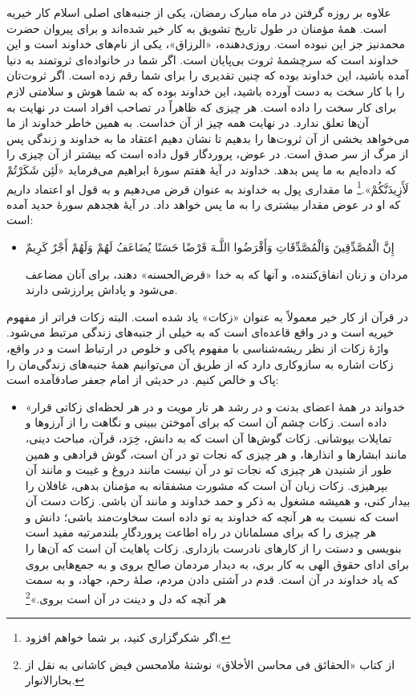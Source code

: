 علاوه بر روزه گرفتن در ماه مبارک رمضان، یکی از جنبه‌های اصلی اسلام کار خیریه است. همهٔ‌ مؤمنان در طول تاریخ تشویق به کار خیر شده‌اند و برای پیروان حضرت محمد{}نیز جز این نبوده است. روزی‌دهنده، «الرزاق»، یکی از نام‌های خداوند است و  این خداوند است که سرچشمهٔ ثروت بی‌پایان است. اگر شما در خانواده‌ای ثروتمند به دنیا آمده باشید، این خداوند بوده که چنین تقدیری را برای شما رقم زده است. اگر ثروت‌تان را با کار سخت به دست آورده باشید، این خداوند بوده که به شما هوش و سلامتی لازم برای کار سخت را داده است. هر چیزی که ظاهراً در تصاحب افراد است در نهایت به آن‌ها تعلق ندارد. در نهایت همه چیز از آن خداست. به همین خاطر خداوند از ما می‌خواهد  بخشی از آن ثروت‌ها را بدهیم تا نشان دهیم اعتقاد ما به خداوند و زندگی پس از مرگ از سر صدق است. در عوض، پروردگار قول داده است که بیشتر از آن چیزی را که داده‌ایم به ما پس بدهد. خداوند در آیهٔ هفتم سورهٔ ابراهیم می‌فرماید {«لَئِن شَكَرْتُمْ لَأَزِيدَنَّكُمْ».}\footnote{اگر شکرگزاری کنید، بر شما خواهم افزود.} ما مقداری پول به خداوند به عنوان قرض  می‌دهیم و به قول او اعتماد داریم که او در عوض مقدار بیشتری را به ما پس خواهد داد. در آیهٔ هجدهم سورهٔ حدید آمده است:

\begin{itemize}
	\item[]
	{
		إِنَّ الْمُصَّدِّقِينَ وَالْمُصَّدِّقَاتِ وَأَقْرَضُوا اللَّـهَ قَرْضًا حَسَنًا يُضَاعَفُ لَهُمْ وَلَهُمْ أَجْرٌ كَرِيمٌ}
	
	{
		مردان و زنان انفاق‌کننده، و آنها که به خدا «قرض‌الحسنه» دهند، برای آنان مضاعف می‌شود و پاداش پرارزشی دارند.}
\end{itemize}

در قرآن از کار خیر معمولاً به عنوان «زکات» یاد شده است. البته زکات فراتر از مفهوم خیریه است و در واقع قاعده‌ای است که به خیلی از جنبه‌های زندگی مرتبط می‌شود. واژهٔ زکات از نظر ریشه‌شناسی با مفهوم پاکی و خلوص در ارتباط است و در واقع، زکات اشاره به سازوکاری دارد که از طریق آن می‌توانیم همهٔ‌ جنبه‌های زندگی‌مان را پاک و خالص کنیم.  در حدیثی از امام جعفر صادق{}آمده است:

\begin{itemize}
	\item[]
	
	{
		«خدواند در همهٔ اعضای بدنت و در رشد هر تار مویت و در هر لحظه‌ای زکاتی قرار داده است. زکات چشم آن است که برای آموختن ببینی و نگاهت را از آرزوها و تمایلات بپوشانی. زکات گوش‌ها آن است که به دانش، خِرَد، قرآن، مباحث دینی، مانند ابشارها و انذارها، و هر چیزی که نجات تو در آن است، گوش فرادهی و همین طور از شنیدن هر چیزی که نجات تو در آن نیست مانند دروغ و غیبت و مانند آن بپرهیزی. زکات زبان آن است که مشورت مشفقانه به مؤمنان بدهی، غافلان را بیدار کنی، و همیشه مشغول به ذکر و حمد خداوند و مانند آن باشی. زکات دست آن است که نسبت به هر آنچه که خداوند به تو داده است سخاوت‌مند باشی؛ دانش و هر چیزی را که برای مسلمانان در راه اطاعت پروردگارِ بلندمرتبه مفید است بنویسی و دستت را از کارهای نادرست بازداری. زکات پاهایت آن است که آن‌ها را برای ادای حقوق الهی به کار بری، به دیدار مردمان صالح بروی و به جمع‌هایی بروی که یاد خداوند در آن است. قدم در آشتی دادن مردم، صلهٔ رحم، جهاد، و به سمت هر آنچه که  دل و دینت در آن است بروی.»}\footnote{از کتاب «الحقائق فی محاسن الأخلاق» نوشتهٔ ملامحسن فیض کاشانی به نقل از بحارالانوار.}
\end{itemize}

